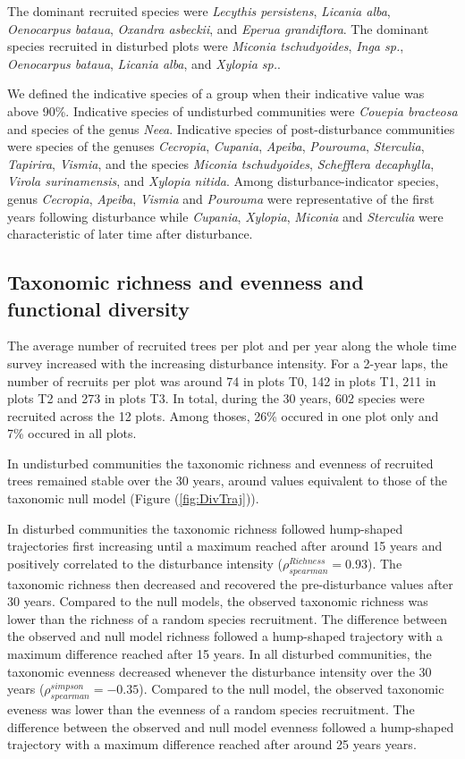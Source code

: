 \documentclass[fleqn,10pt]{ArtEcoFoG} %
\begin{document}
The dominant recruited species were \emph{Lecythis persistens},
\emph{Licania alba}, \emph{Oenocarpus bataua}, \emph{Oxandra asbeckii},
and \emph{Eperua grandiflora}. The dominant species recruited in
disturbed plots were \emph{Miconia tschudyoides}, \emph{Inga sp.},
\emph{Oenocarpus bataua}, \emph{Licania alba}, and \emph{Xylopia sp.}.

We defined the indicative species of a group when their indicative value
was above 90\%. Indicative species of undisturbed communities were
\emph{Couepia bracteosa} and species of the genus \emph{Neea}.
Indicative species of post-disturbance communities were species of the
genuses \emph{Cecropia}, \emph{Cupania}, \emph{Apeiba}, \emph{Pourouma},
\emph{Sterculia}, \emph{Tapirira}, \emph{Vismia}, and the species
\emph{Miconia tschudyoides}, \emph{Schefflera decaphylla}, \emph{Virola
surinamensis}, and \emph{Xylopia nitida}. Among disturbance-indicator
species, genus \emph{Cecropia}, \emph{Apeiba}, \emph{Vismia} and
\emph{Pourouma} were representative of the first years following
disturbance while \emph{Cupania}, \emph{Xylopia}, \emph{Miconia} and
\emph{Sterculia} were characteristic of later time after disturbance.

\subsection{Taxonomic richness and evenness and functional
diversity}\label{taxonomic-richness-and-evenness-and-functional-diversity}

The average number of recruited trees per plot and per year along the
whole time survey increased with the increasing disturbance intensity.
For a 2-year laps, the number of recruits per plot was around 74 in
plots T0, 142 in plots T1, 211 in plots T2 and 273 in plots T3. In
total, during the 30 years, 602 species were recruited across the 12
plots. Among thoses, 26\% occured in one plot only and 7\% occured in
all plots.

In undisturbed communities the taxonomic richness and evenness of
recruited trees remained stable over the 30 years, around values
equivalent to those of the taxonomic null model (Figure
(\ref{fig:DivTraj})).

In disturbed communities the taxonomic richness followed hump-shaped
trajectories first increasing until a maximum reached after around 15
years and positively correlated to the disturbance intensity
(\(\rho^{Richness}_{spearman}=0.93\)). The taxonomic richness then
decreased and recovered the pre-disturbance values after 30 years.
Compared to the null models, the observed taxonomic richness was lower
than the richness of a random species recruitment. The difference
between the observed and null model richness followed a hump-shaped
trajectory with a maximum difference reached after 15 years. In all
disturbed communities, the taxonomic evenness decreased whenever the
disturbance intensity over the 30 years
(\(\rho^{simpson}_{spearman}=-0.35\)). Compared to the null model, the
observed taxonomic eveness was lower than the evenness of a random
species recruitment. The difference between the observed and null model
evenness followed a hump-shaped trajectory with a maximum difference
reached after around 25 years years.
\end{document}
